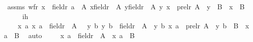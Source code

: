 \begin{isabellebody}
\ assms{\isacharcolon}{\kern0pt}\ {\isachardoublequoteopen}wf{\isacharparenleft}{\kern0pt}r{\isacharparenright}{\kern0pt}{\isachardoublequoteclose}\ {\isachardoublequoteopen}x\ {\isasymin}\ field{\isacharparenleft}{\kern0pt}r{\isacharparenright}{\kern0pt}{\isachardoublequoteclose}\ {\isachardoublequoteopen}a\ {\isasymin}\ A{\isachardoublequoteclose}\ {\isachardoublequoteopen}{\isasymforall}x{\isasymin}field{\isacharparenleft}{\kern0pt}r{\isacharparenright}{\kern0pt}\ {\isasymtimes}\ A{\isachardot}{\kern0pt}\ {\isacharparenleft}{\kern0pt}{\isasymforall}y{\isasymin}field{\isacharparenleft}{\kern0pt}r{\isacharparenright}{\kern0pt}\ {\isasymtimes}\ A{\isachardot}{\kern0pt}\ {\isasymlangle}y{\isacharcomma}{\kern0pt}\ x{\isasymrangle}\ {\isasymin}\ prel{\isacharparenleft}{\kern0pt}r{\isacharcomma}{\kern0pt}\ A{\isacharparenright}{\kern0pt}\ {\isasymlongrightarrow}\ y\ {\isasymin}\ B{\isacharparenright}{\kern0pt}\ {\isasymlongrightarrow}\ x\ {\isasymin}\ B{\isachardoublequoteclose}\ \isanewline
\isanewline
\ \ \isamarkupfalse%
\ \isamarkupfalse%
\ ih\ {\isacharcolon}{\kern0pt}\ \isanewline
\ \ \ \ {\isachardoublequoteopen}{\isasymAnd}x\ a{\isachardot}{\kern0pt}\ {\isacharless}{\kern0pt}x{\isacharcomma}{\kern0pt}\ a{\isachargreater}{\kern0pt}\ {\isasymin}\ field{\isacharparenleft}{\kern0pt}r{\isacharparenright}{\kern0pt}\ {\isasymtimes}\ A\ {\isasymLongrightarrow}\ {\isacharparenleft}{\kern0pt}{\isasymAnd}\ y\ b{\isachardot}{\kern0pt}\ {\isacharless}{\kern0pt}y{\isacharcomma}{\kern0pt}\ b{\isachargreater}{\kern0pt}\ {\isasymin}\ field{\isacharparenleft}{\kern0pt}r{\isacharparenright}{\kern0pt}\ {\isasymtimes}\ A\ {\isasymLongrightarrow}\ {\isasymlangle}{\isacharless}{\kern0pt}y{\isacharcomma}{\kern0pt}\ b{\isachargreater}{\kern0pt}{\isacharcomma}{\kern0pt}\ {\isacharless}{\kern0pt}x{\isacharcomma}{\kern0pt}\ a{\isachargreater}{\kern0pt}{\isasymrangle}\ {\isasymin}\ prel{\isacharparenleft}{\kern0pt}r{\isacharcomma}{\kern0pt}\ A{\isacharparenright}{\kern0pt}\ {\isasymLongrightarrow}\ {\isacharless}{\kern0pt}y{\isacharcomma}{\kern0pt}\ b{\isachargreater}{\kern0pt}\ {\isasymin}\ B{\isacharparenright}{\kern0pt}\ {\isasymLongrightarrow}\ {\isacharless}{\kern0pt}x{\isacharcomma}{\kern0pt}\ a{\isachargreater}{\kern0pt}\ {\isasymin}\ B{\isachardoublequoteclose}\ \isamarkupfalse%
\ auto\ \isanewline
\isanewline
\ \ \isamarkupfalse%
\ {\isachardoublequoteopen}{\isacharless}{\kern0pt}x{\isacharcomma}{\kern0pt}\ a{\isachargreater}{\kern0pt}\ {\isasymin}\ field{\isacharparenleft}{\kern0pt}r{\isacharparenright}{\kern0pt}\ {\isasymtimes}\ A\ {\isasymlongrightarrow}\ {\isacharless}{\kern0pt}x{\isacharcomma}{\kern0pt}\ a{\isachargreater}{\kern0pt}\ {\isasymin}\ B{\isachardoublequoteclose}\ \isanewline

\end{isabellebody}
